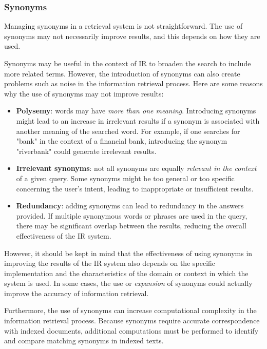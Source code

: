 \subsubsection{Synonyms}
\label{subsubsec:synonyms}

Managing synonyms in a retrieval system is not straightforward. The use of synonyms may not necessarily improve results, and this depends on how they are used.

Synonyms may be useful in the context of \ac{IR} to broaden the search to include more related terms. However, the introduction of synonyms can also create problems such as noise in the information retrieval process. Here are some reasons why the use of synonyms may not improve results:
\begin{itemize}
	\item \textbf{Polysemy}: words may have \emph{more than one meaning}. Introducing synonyms might lead to an increase in irrelevant results if a synonym is associated with another meaning of the searched word. For example, if one searches for "bank" in the context of a financial bank, introducing the synonym "riverbank" could generate irrelevant results.
	\item \textbf{Irrelevant synonyms}: not all synonyms are equally \emph{relevant in the context} of a given query. Some synonyms might be too general or too specific concerning the user's intent, leading to inappropriate or insufficient results.
	\item \textbf{Redundancy}: adding synonyms can lead to redundancy in the answers provided. If multiple synonymous words or phrases are used in the query, there may be significant overlap between the results, reducing the overall effectiveness of the IR system.
\end{itemize}

However, it should be kept in mind that the effectiveness of using synonyms in improving the results of the IR system also depends on the specific implementation and the characteristics of the domain or context in which the system is used. In some cases, the use or \emph{expansion} of synonyms could actually improve the accuracy of information retrieval. 

Furthermore, the use of synonyms can increase computational complexity in the information retrieval process. Because synonyms require accurate correspondence with indexed documents, additional computations must be performed to identify and compare matching synonyms in indexed texts.

